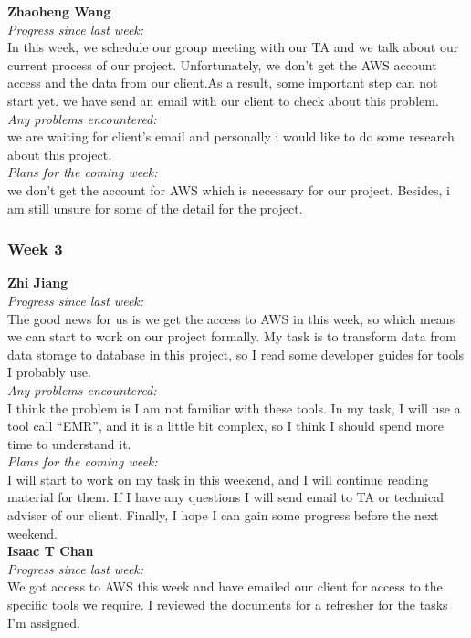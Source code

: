 \noindent\textbf{Zhaoheng Wang}\\
\noindent\textit{Progress since last week:}\\
In this week, we schedule our group meeting with our TA and we talk about our current process of our project. Unfortunately, we don't get the AWS account access and the data from our client.As a result, some important step can not start yet. we have send an email with our client to check about this problem.\\

\noindent\textit{Any problems encountered:}\\
we are waiting for client's email and personally i would like to do some research about this project.\\

\noindent\textit{Plans for the coming week:}\\
we don't get the account for AWS which is necessary for our project. Besides, i am still unsure for some of the detail for the project.\\

\subsubsection{Week 3}
\textbf{Zhi Jiang}\\
\noindent\textit{Progress since last week:}\\
The good news for us is we get the access to AWS in this week, so which means we can start to work on our project formally. My task is to transform data from data storage to database in this project, so I read some developer guides for tools I probably use.\\

\noindent\textit{Any problems encountered:}\\
I think the problem is I am not familiar with these tools. In my task, I will use a tool call “EMR”, and it is a little bit complex, so I think I should spend more time to understand it.\\

\noindent\textit{Plans for the coming week:}\\
I will start to work on my task in this weekend, and I will continue reading material for them. If I have any questions I will send email to TA or technical adviser of our client. Finally, I hope I can gain some progress before the next weekend.\\

\noindent\textbf{Isaac T Chan}\\
\noindent\textit{Progress since last week:}\\
We got access to AWS this week and have emailed our client for access to the specific tools we require. I reviewed the documents for a refresher for the tasks I'm assigned.\\

